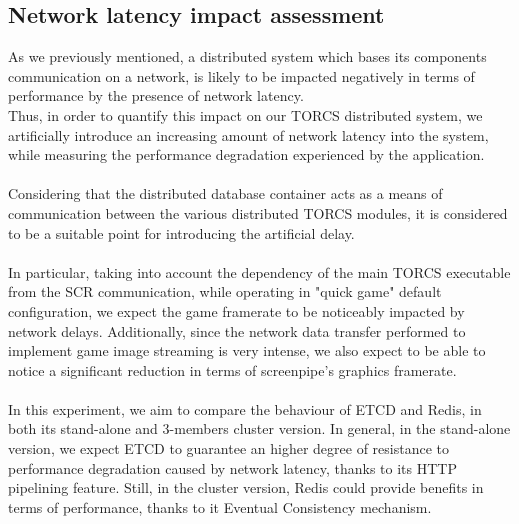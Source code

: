 \subsection{Network latency impact assessment}
As we previously mentioned, a distributed system which bases its components communication on a network, is likely to be impacted negatively in terms of performance by the presence of network latency. \\
Thus, in order to quantify this impact on our TORCS distributed system, we artificially introduce an increasing amount of network latency into the system, while measuring the performance degradation experienced by the application. \\ \\
Considering that the distributed database container acts as a means of communication between the various distributed TORCS modules, it is considered to be a suitable point for introducing the artificial delay. \\ \\
In particular, taking into account the dependency of the main TORCS executable from the SCR communication, while operating in "quick game" default configuration, we expect the game framerate to be noticeably impacted by network delays. Additionally, since the network data transfer performed to implement game image streaming is very intense, we also expect to be able to notice a significant reduction in terms of screenpipe's graphics framerate. \\ \\
In this experiment, we aim to compare the behaviour of ETCD and Redis, in both its stand-alone and 3-members cluster version. In general, in the stand-alone version, we expect ETCD to guarantee an higher degree of resistance to performance degradation caused by network latency, thanks to its HTTP pipelining feature. Still, in the cluster version, Redis could provide benefits in terms of performance, thanks to it Eventual Consistency mechanism.

